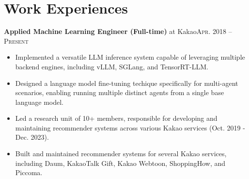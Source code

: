 \documentclass[11pt,a4paper]{article}
\newenvironment{entry}{
  \begin{list}{}{
    \setlength{\leftmargin}{0em}
    \setlength{\itemsep}{0.25em}
    \setlength{\parskip}{0pt}
    \setlength{\parsep}{0.25em}
  }
}{
  \end{list}
}
\begin{document}
\section*{Work Experiences}
\begin{entry}
  \setlength\itemsep{0.1em}
  \item \textbf{Applied Machine Learning Engineer (Full-time)} at Kakao\hfill\textsc{Apr. 2018 -- Present}
  \begin{itemize}
    \setlength\itemsep{0.05em}
    \item Implemented a versatile LLM inference system capable of leveraging multiple backend engines, including vLLM, SGLang, and TensorRT-LLM.
    \item Designed a language model fine-tuning techique specifically for multi-agent scenarios, enabling running multiple distinct agents from a single base language model.
    \item Led a research unit of 10+ members, responsible for developing and maintaining recommender systems across various Kakao services (Oct. 2019 - Dec. 2023).
    \item Built and maintained recommender systems for several Kakao services, including Daum, KakaoTalk Gift, Kakao Webtoon, ShoppingHow, and Piccoma.
  \end{itemize}
\end{entry}

\end{document}
